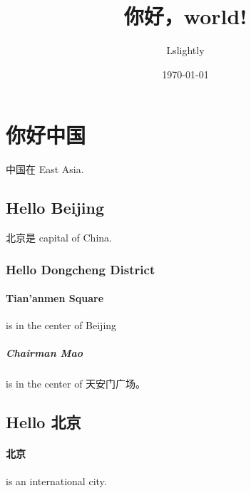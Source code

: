 \documentclass{ctexart}
\title{你好，world!}
\author{Lslightly}
\date{\today}
\begin{document}
\maketitle
\section{你好中国}
中国在 East Asia.
\subsection{Hello Beijing}
北京是 capital of China.
\subsubsection{Hello Dongcheng District}
\paragraph{Tian'anmen Square}
is in the center of Beijing
\subparagraph{Chairman Mao}
is in the center of 天安门广场。
\subsection{Hello 北京}
\paragraph{北京} is an international city.
\end{document}
